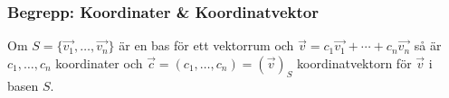 \documentclass[10pt]{article}
\newcommand{\begrepp} [1] {\subsubsection{\textcolor{Cerulean}{Begrepp: #1}}}
\begin{document}
\begrepp{Koordinater \& Koordinatvektor}
Om $S = \{\vec{v_{1}}, \ldots, \vec{v_{n}}\}$ är en bas för ett vektorrum och $\vec{v} = c_{1}\vec{v_{1}} + \cdots + c_{n}\vec{v_{n}}$ så är $c_{1},\ldots,c_{n}$ koordinater och $\vec{c} = (c_{1}, \ldots, c_{n}) = {(\vec{v})}_{S}$ koordinatvektorn för $\vec{v}$ i basen $S$. 
\end{document}

